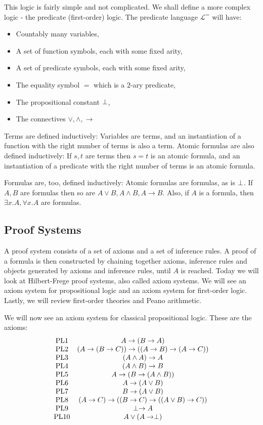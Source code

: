 This logic is fairly simple and not complicated. We shall define a more complex logic -
the predicate (first-order) logic.
The predicate language $\mathcal{L}^=$ will have:
\begin{itemize} 
\item Countably many variables,
\item A set of function symbols, each with some fixed arity,
\item A set of predicate symbols, each with some fixed arity,
\item The equality symbol $=$ which is a $2$-ary predicate,
\item The propositional constant $\perp$,
\item The connectives $\vee, \wedge, \to$
\end{itemize}

Terms are defined inductively: Variables are terms, and an instantiation of a function with the right
number of terms is also a term. Atomic formulas are also defined inductively: If $s, t$ are terms
then $s = t$ is an atomic formula, and an instantiation of a predicate with the right number of terms
is an atomic formula.

Formulas are, too, defined inductively: Atomic formulas are formulas, as is $\perp$. If
$A, B$ are formulas then so are $A\vee B, A \wedge B, A \to B$.
Also, if $A$ is a formula, then $\exists x. A, \forall x. A$ are formulas.

\subsection{Proof Systems}
A proof system consists of a set of axioms and a set of inference rules. A proof of a formula
is then constructed by chaining together axioms, inference rules and objects
generated by axioms and inference rules, until $A$ is reached. Today we will look at
Hilbert-Frege proof systems, also called axiom systems. We will see an axiom system
for propositional logic and an axiom system for first-order logic. Lastly, we will
review first-order theories and Peano arithmetic.

We will now see an axiom system for classical propositional logic. These are the axioms:
\[
\begin{array}{cc}
\text{PL1}& A \to (B \to A)\\
\text{PL2}& (A \to (B \to C)) \to ((A \to B) \to (A \to C))\\
\text{PL3}& (A \wedge A) \to A\\
\text{PL4}& (A \wedge B) \to B\\
\text{PL5}& A \to (B \to (A \wedge B))\\
\text{PL6}& A \to (A \vee B)\\
\text{PL7}& B \to (A \vee B)\\
\text{PL8}& (A \to C) \to ((B \to C) \to ((A \vee B) \to C))\\
\text{PL9}& \perp \to A\\
\text{PL10}& A \vee (A \to \perp)\\
\end{array}
\]

